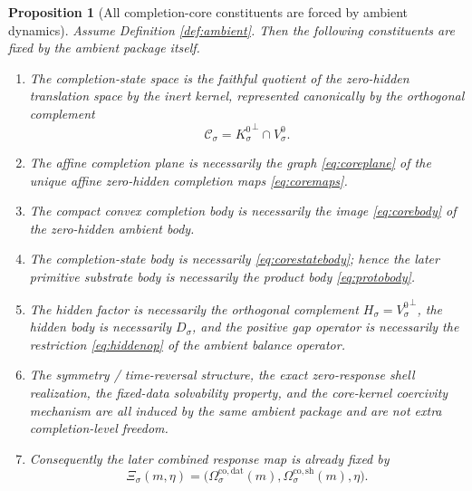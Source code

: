 \documentclass[11pt]{article}
\newcommand{\ZeroHiddenVec}[1]{V_{#1}^{0}}
\newcommand{\Kernel}[1]{K_{#1}^{0}}
\newcommand{\GapSpace}[1]{H_{#1}}
\newcommand{\GapBody}[1]{D_{#1}}
\newcommand{\CoreState}[1]{\mathcal C_{#1}}
\newcommand{\CoreDataMap}[1]{\Omega_{#1}^{\mathrm{co,dat}}}
\newcommand{\CoreShellMap}[1]{\Omega_{#1}^{\mathrm{co,sh}}}
\newcommand{\ResponseMap}[1]{\Xi_{#1}}
\newtheorem{proposition}{Proposition}
\begin{document}
\begin{proposition}[All completion-core constituents are forced by ambient dynamics]
\label{prop:forced}
Assume Definition \ref{def:ambient}. Then the following constituents are fixed by the ambient package itself.
\begin{enumerate}
    \item The completion-state space is the faithful quotient of the zero-hidden translation space by the inert kernel, represented canonically by the orthogonal complement
    \[
    \CoreState{\sigma}={\Kernel{\sigma}}^{\perp}\cap\ZeroHiddenVec{\sigma}.
    \]
    \item The affine completion plane is necessarily the graph \eqref{eq:coreplane} of the unique affine zero-hidden completion maps \eqref{eq:coremaps}.
    \item The compact convex completion body is necessarily the image \eqref{eq:corebody} of the zero-hidden ambient body.
    \item The completion-state body is necessarily \eqref{eq:corestatebody}; hence the later primitive substrate body is necessarily the product body \eqref{eq:protobody}.
    \item The hidden factor is necessarily the orthogonal complement \(\GapSpace{\sigma}={\ZeroHiddenVec{\sigma}}^{\perp}\), the hidden body is necessarily \(\GapBody{\sigma}\), and the positive gap operator is necessarily the restriction \eqref{eq:hiddenop} of the ambient balance operator.
    \item The symmetry / time-reversal structure, the exact zero-response shell realization, the fixed-data solvability property, and the core-kernel coercivity mechanism are all induced by the same ambient package and are not extra completion-level freedom.
    \item Consequently the later combined response map is already fixed by
    \[
    \ResponseMap{\sigma}(m,\eta)
    =
    \bigl(
    \CoreDataMap{\sigma}(m),
    \CoreShellMap{\sigma}(m),
    \eta
    \bigr).
    \]
\end{enumerate}
\end{proposition}
\end{document}
